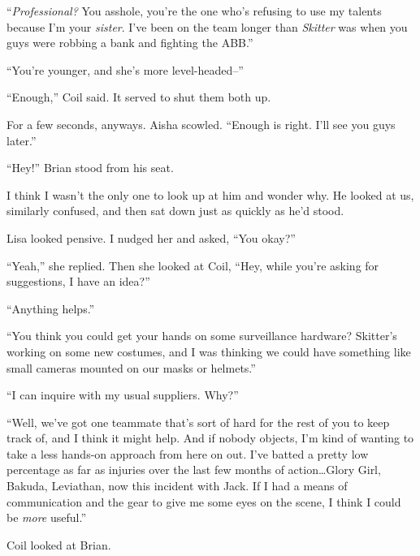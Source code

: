 ``\emph{Professional?}  You asshole, you're the one who's refusing to use my talents because I'm your \emph{sister}.  I've been on the team longer than \emph{Skitter} was when you guys were robbing a bank and fighting the ABB.''



``You're younger, and she's more level-headed--''



``Enough,'' Coil said.  It served to shut them both up.



For a few seconds, anyways.  Aisha scowled.  ``Enough is right.  I'll see you guys later.''



``Hey!''  Brian stood from his seat.



I think I wasn't the only one to look up at him and wonder why.  He looked at us, similarly confused, and then sat down just as quickly as he'd stood.



Lisa looked pensive.  I nudged her and asked, ``You okay?''



``Yeah,'' she replied.  Then she looked at Coil, ``Hey, while you're asking for suggestions, I have an idea?''



``Anything helps.''



``You think you could get your hands on some surveillance hardware?  Skitter's working on some new costumes, and I was thinking we could have something like small cameras mounted on our masks or helmets.''



``I can inquire with my usual suppliers.  Why?''



``Well, we've got one teammate that's sort of hard for the rest of you to keep track of, and I think it might help.  And if nobody objects, I'm kind of wanting to take a less hands-on approach from here on out.  I've batted a pretty low percentage as far as injuries over the last few months of action\ldots Glory Girl, Bakuda, Leviathan, now this incident with Jack.  If I had a means of communication and the gear to give me some eyes on the scene, I think I could be \emph{more} useful.''



Coil looked at Brian.



